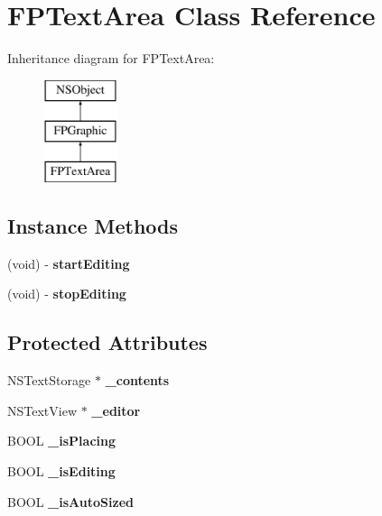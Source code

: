 \hypertarget{interface_f_p_text_area}{}\section{F\+P\+Text\+Area Class Reference}
\label{interface_f_p_text_area}
Inheritance diagram for F\+P\+Text\+Area\+:\begin{figure}[H]
\begin{center}
\leavevmode
\includegraphics[height=3.000000cm]{interface_f_p_text_area}
\end{center}
\end{figure}
\subsection*{Instance Methods}
\begin{DoxyCompactItemize}
\item 
\mbox{\label{interface_f_p_text_area_a1de4bf0236e33a8fdf72528eef4dc605}} 
(void) -\/ {\bfseries start\+Editing}
\item 
\mbox{\label{interface_f_p_text_area_ad154a4949c733d85a89929deb922db8d}} 
(void) -\/ {\bfseries stop\+Editing}
\end{DoxyCompactItemize}
\subsection*{Protected Attributes}
\begin{DoxyCompactItemize}
\item 
\mbox{\label{interface_f_p_text_area_ab773a238f19bb71b88222d8d152f34ae}} 
N\+S\+Text\+Storage $\ast$ {\bfseries \+\_\+contents}
\item 
\mbox{\label{interface_f_p_text_area_ace38a60e272397fd55ec8aaae4fa8a5d}} 
N\+S\+Text\+View $\ast$ {\bfseries \+\_\+editor}
\item 
\mbox{\label{interface_f_p_text_area_ad215ec14cd98a43acb2c5896a40210c0}} 
B\+O\+OL {\bfseries \+\_\+is\+Placing}
\item 
\mbox{\label{interface_f_p_text_area_a1a77586cc6b560d6abfd969d40ec8c21}} 
B\+O\+OL {\bfseries \+\_\+is\+Editing}
\item 
\mbox{\label{interface_f_p_text_area_a5f6e29a6ca6b81e8414dcbc64c054932}} 
B\+O\+OL {\bfseries \+\_\+is\+Auto\+Sized}
\end{DoxyCompactItemize}
